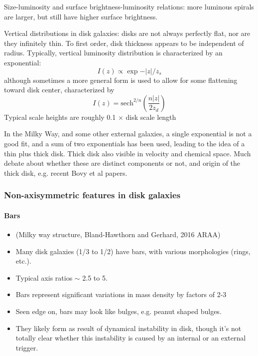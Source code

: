 \documentclass{article}
\begin{document}
Size-luminosity and surface brightness-luminosity relations: more luminous
spirals are larger, but still have higher surface brightness.

Vertical distributions in disk galaxies: disks are not always perfectly flat,
nor are they infinitely thin. To first order, disk thickness appears to be
independent of radius. Typically, vertical luminosity distribution is
characterized by an exponential:
\[
    I(z) \propto \exp{-\vert z \vert/z_{s}}
    \]
although sometimes a more general form is used to allow for some flattening
toward disk center, characterized by
\[
    I(z) = \mathrm{sech}^{2/n} \left( \frac{n \vert z \vert} {2z_{d}} \right)
    \]
Typical scale heights are roughly 0.1 $\times$ disk scale length

In the Milky Way, and some other external galaxies, a single exponential is
not a good fit, and a sum of two exponentials has been used, leading to the
idea of a thin plus thick disk. Thick disk also visible in velocity and
chemical space. Much debate about whether these are distinct components or
not, and origin of the thick disk, e.g. recent Bovy et al papers.

\subsubsection{Non-axisymmetric features in disk galaxies}
\paragraph{Bars}
\begin{itemize}
    \item (Milky way structure, Bland-Hawthorn and Gerhard, 2016 ARAA)
    \item Many disk galaxies (1/3 to 1/2) have bars, with various morphologies
        (rings, etc.).
    \item Typical axis ratios $\sim$ 2.5 to 5.
    \item Bars represent significant variations in mass density by factors of 2-3
    \item Seen edge on, bars may look like bulges, e.g. peanut shaped bulges.
    \item They likely form as result of dynamical instability in disk, though
        it's not totally clear whether this instability is caused by an
        internal or an external trigger.
\end{itemize}
\end{document}
